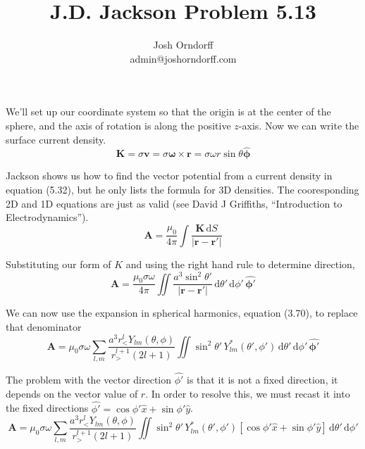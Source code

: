 \documentclass[10pt,a4paper]{article}
\begin{document}
\title{J.D. Jackson Problem 5.13}
\author{Josh Orndorff \\ admin@joshorndorff.com}
\maketitle

We'll set up our coordinate system so that the origin is at the center of the sphere, and the axis of rotation is along the positive $z$-axis.  Now we can write the surface current density.
\begin{equation}
\mathbf{K}=\sigma\mathbf{v}=\sigma\mathbf{\omega}\times\mathbf{r}=\sigma\omega r \sin\theta\mathbf{\hat{\phi}}
\end{equation}

Jackson shows us how to find the vector potential from a current density in equation (5.32), but he only lists the formula for 3D densities.  The cooresponding 2D and 1D equations are just as valid (see David J Griffiths, ``Introduction to Electrodynamics'').
\begin{equation}
\mathbf{A}=\frac{\mu_0}{4\pi}\int\frac{\mathbf{K}\,\mathrm{d}S}{|\mathbf{r}-\mathbf{r'}|}
\end{equation}

Substituting our form of $K$ and using the right hand rule to determine direction,
\begin{equation}
\mathbf{A}=\frac{\mu_0\sigma\omega}{4\pi}\iint\frac{a^3\sin^2\theta'}{|\mathbf{r}-\mathbf{r'}|}\,\mathrm{d}\theta'\,\mathrm{d}\phi'\,\mathbf{\hat{\phi'}}
\end{equation}

We can now use the expansion in spherical harmonics, equation (3.70), to replace that denominator
\begin{equation}
\mathbf{A}=\mu_0\sigma\omega\sum_{l,m}\frac{a^3r_<^lY_{lm}(\theta, \phi)}{r_>^{l+1}(2l+1)}\iint\sin^2\theta' \,Y^*_{lm}(\theta',\phi')\,\mathrm{d}\theta'\,\mathrm{d}\phi'\,\mathbf{\hat{\phi'}}
\end{equation}

The problem with the vector direction $\hat{\phi'}$ is that it is not a fixed direction, it depends on the vector value of $r$.  In order to resolve this, we must recast it into the fixed directions $\hat{\phi'}=\cos\phi'\hat{x}+\sin\phi'\hat{y}$.
\begin{equation}
\mathbf{A}=\mu_0\sigma\omega\sum_{l,m}\frac{a^3r_<^lY_{lm}(\theta, \phi)}{r_>^{l+1}(2l+1)}\iint\sin^2\theta' \,Y^*_{lm}(\theta',\phi')[\cos\phi'\hat{x}+\sin\phi'\hat{y}]\,\mathrm{d}\theta'\,\mathrm{d}\phi'
\end{equation}
\end{document}
